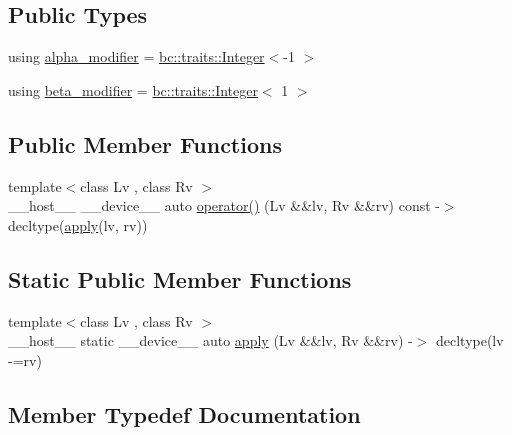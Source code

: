 \subsection*{Public Types}
\begin{DoxyCompactItemize}
\item 
using \hyperlink{structbc_1_1oper_1_1Alias__Sub__Assign_a5ba31eaac25a5aa2465dbd9693e43886}{alpha\+\_\+modifier} = \hyperlink{structbc_1_1traits_1_1Integer}{bc\+::traits\+::\+Integer}$<$-\/1 $>$
\item 
using \hyperlink{structbc_1_1oper_1_1Alias__Sub__Assign_a6e0907ffcf3b224294ee441a17cbe22c}{beta\+\_\+modifier} = \hyperlink{structbc_1_1traits_1_1Integer}{bc\+::traits\+::\+Integer}$<$ 1 $>$
\end{DoxyCompactItemize}
\subsection*{Public Member Functions}
\begin{DoxyCompactItemize}
\item 
{\footnotesize template$<$class Lv , class Rv $>$ }\\\+\_\+\+\_\+host\+\_\+\+\_\+ \+\_\+\+\_\+device\+\_\+\+\_\+ auto \hyperlink{structbc_1_1oper_1_1Alias__Sub__Assign_a72b32c4a8603270cbe64995b2b4a4b58}{operator()} (Lv \&\&lv, Rv \&\&rv) const -\/$>$ decltype(\hyperlink{structbc_1_1oper_1_1Alias__Sub__Assign_a65827a9261b00d81d8724e623309f380}{apply}(lv, rv))
\end{DoxyCompactItemize}
\subsection*{Static Public Member Functions}
\begin{DoxyCompactItemize}
\item 
{\footnotesize template$<$class Lv , class Rv $>$ }\\\+\_\+\+\_\+host\+\_\+\+\_\+ static \+\_\+\+\_\+device\+\_\+\+\_\+ auto \hyperlink{structbc_1_1oper_1_1Alias__Sub__Assign_a65827a9261b00d81d8724e623309f380}{apply} (Lv \&\&lv, Rv \&\&rv) -\/$>$ decltype(lv -\/=rv)
\end{DoxyCompactItemize}


\subsection{Member Typedef Documentation}
\mbox{\label{structbc_1_1oper_1_1Alias__Sub__Assign_a5ba31eaac25a5aa2465dbd9693e43886}} 
